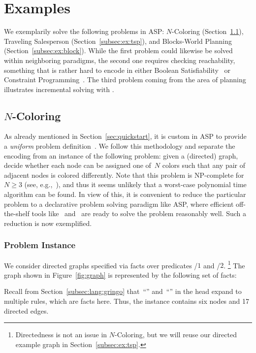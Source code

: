 \section{Examples}\label{sec:examples}

We exemplarily solve the following problems in ASP:
$N$-Coloring (Section~\ref{subsec:ex:color}),
Traveling Salesperson (Section~\ref{subsec:ex:tsp}), and
Blocks-World Planning (Section~\ref{subsec:ex:block}).
While the first problem could likewise be solved within neighboring paradigms,
the second one requires checking reachability,
something that is rather hard to encode in either
Boolean Satisfiability~\cite{bihemawa08a} or
Constraint Programming~\cite{robewa06a}.
The third problem coming from the area of planning
illustrates incremental solving with \iclingo.
 

\subsection{\texorpdfstring{$N$}{N}-Coloring}\label{subsec:ex:color}

As already mentioned in Section~\ref{sec:quickstart},
it is custom in ASP to provide a \emph{uniform}
problem definition~\cite{martru99a,niemela99a,schlipf95a}.
We follow this methodology and separate the encoding
from an instance of the following problem:
given a (directed) graph, decide whether each node can be assigned
one of~$N$ colors such that any pair of adjacent nodes is colored differently.
Note that this problem is NP-complete for~$N\geq 3$
(see, e.g.,~\cite{papadimitriou94a}),
and thus it seems unlikely that a worst-case polynomial time algorithm
can be found.
In view of this,
it is convenient to reduce the particular problem to
a declarative problem solving paradigm like ASP,
where efficient off-the-shelf tools like \gringo\ and \clasp\
are ready to solve the problem reasonably well.
Such a reduction is now exemplified.

\subsubsection{Problem Instance}\label{subsec:color:instance}


We consider directed graphs specified via facts over predicates
/$1$ and /$2$.%
\footnote{%
  Directedness is not an issue in $N$-Coloring,
  but we will reuse our directed example graph in Section~\ref{subsec:ex:tsp}.}
The graph shown in Figure~\ref{fig:graph} is represented by the following set of facts:
%

%
Recall from Section~\ref{subsec:lang:gringo} that~``'' and~``\code{;}''
in the head expand to multiple rules, which are facts here.
Thus, the instance contains six nodes and 17 directed edges.

